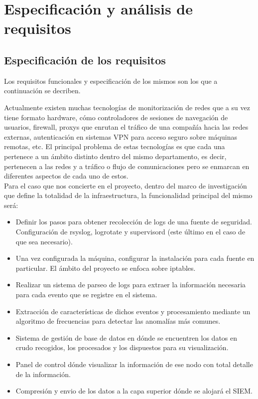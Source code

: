\chapter[Requisitos]{Especificación y análisis de requisitos}
\label{chap:requisitos}

\section[Especificación]{Especificación de los requisitos}

Los requisitos funcionales y especificación de los mismos son los que a continuación se decriben.

Actualmente existen muchas tecnologías de monitorización de redes que a su vez tiene formato hardware, cómo controladores de sesiones de navegación de usuarios, firewall, proxys que enrutan el tráfico de una compañía hacia las redes externas, autenticación en sistemas VPN para acceso seguro sobre máquinas remotas, etc. El principal problema de estas tecnologías es que cada una pertenece a un ámbito distinto dentro del mismo departamento, es decir, pertenecen a las redes y a tráfico o flujo de comunicaciones pero se enmarcan en diferentes aspectos de cada uno de estos. \\

Para el caso que nos concierte en el proyecto, dentro del marco de investigación que define la totalidad de la infraestructura, la funcionalidad principal del mismo será:

\begin{itemize}
\item Definir los pasos para obtener recolección de logs de una fuente de seguridad. Configuración de rsyslog, logrotate y supervisord (este último en el caso de que sea necesario).
\item Una vez configurada la máquina, configurar la instalación para cada fuente en particular. El ámbito del proyecto se enfoca sobre iptables.
\item Realizar un sistema de parseo de logs para extraer la información necesaria para cada evento que se registre en el sistema.
\item Extracción de características de dichos eventos y procesamiento mediante un algoritmo de frecuencias para detectar las anomalías más comunes.
\item Sistema de gestión de base de datos en dónde se encuentren los datos en crudo recogidos, los procesados y los dispuestos para su visualización.
\item Panel de control dónde visualizar la información de ese nodo con total detalle de la información.
\item Compresión y envio de los datos a la capa superior dónde se alojará el SIEM.
\end{itemize}

